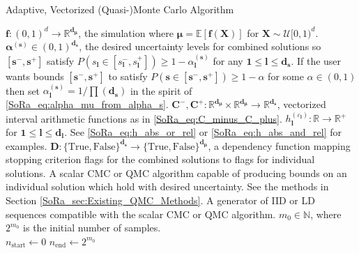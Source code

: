 \documentclass[graybox]{svmult}
\begin{document}
\begin{algorithm}[t]
    \caption{Adaptive, Vectorized (Quasi-)Monte Carlo Algorithm}
    \label{SoRa_algo:MCStoppingCriterion}
    \begin{algorithmic}
    \Require $\boldsymbol{f}: (0,1)^d \to \mathbb{R}^{\boldsymbol{d}_{\boldsymbol{\mu}}}$, the simulation where $\boldsymbol{\mu} = \mathbb{E}[\boldsymbol{f}(\boldsymbol{X})]$ for $\boldsymbol{X} \sim \mathcal{U}[0,1)^d$.
    \Require $\boldsymbol{\alpha}^{(\boldsymbol{s})} \in (0,1)^{\boldsymbol{d}_{\boldsymbol{s}}}$, the desired uncertainty levels for combined solutions so $[\boldsymbol{s}^-,\boldsymbol{s}^+]$ satisfy $P(s_{\boldsymbol{l}} \in [s_{\boldsymbol{l}}^-,s_{\boldsymbol{l}}^+]) \geq 1-\alpha^{(\boldsymbol{s})}_{\boldsymbol{l}}$ for any $\boldsymbol{1} \leq \boldsymbol{l} \leq \boldsymbol{d}_{\boldsymbol{s}}$. If the user wants bounds $[\boldsymbol{s}^-,\boldsymbol{s}^+]$ to satisfy $P(\boldsymbol{s} \in [\boldsymbol{s}^-,\boldsymbol{s}^+]) \geq 1-\alpha$ for some $\alpha \in (0,1)$ then set $\alpha_{\boldsymbol{l}}^{(\boldsymbol{s})} = 1/\prod(\boldsymbol{d}_{\boldsymbol{s}})$ in the spirit of \eqref{SoRa_eq:alpha_mu_from_alpha_s}.
    \Require $\boldsymbol{C}^-,\boldsymbol{C}^+: \mathbb{R}^{\boldsymbol{d}_{\boldsymbol{\mu}}} \times \mathbb{R}^{\boldsymbol{d}_{\boldsymbol{\mu}}} \to \mathbb{R}^{\boldsymbol{d}_{\boldsymbol{s}}}$, vectorized interval arithmetic functions as in \eqref{SoRa_eq:C_minus_C_plus}.
    \Require $h^{(\varepsilon_{\boldsymbol{l}})}_{\boldsymbol{l}}: \mathbb{R} \to \mathbb{R}^+$ for $\boldsymbol{1} \leq \boldsymbol{l} \leq \boldsymbol{d}_{\boldsymbol{l}}$. See \eqref{SoRa_eq:h_abs_or_rel} or \eqref{SoRa_eq:h_abs_and_rel} for examples.
    \Require $\boldsymbol{D}: \{\text{True},\text{False}\}^{\boldsymbol{d}_{\boldsymbol{s}}} \to \{\text{True},\text{False}\}^{\boldsymbol{d}_{\boldsymbol{\mu}}}$, a dependency function mapping stopping criterion flags for the combined solutions to flags for individual solutions. 
    \Require A scalar CMC or QMC algorithm capable of producing bounds on an individual solution which hold with desired uncertainty. See the methods in Section \ref{SoRa_sec:Existing_QMC_Methods}.
    \Require A generator of IID or LD sequences compatible with the scalar CMC or QMC algorithm. 
    \Require $m_0 \in \mathbb{N}$, where $2^{m_0}$ is the initial number of samples.
    \\ \hrulefill
    \State $n_\text{start} \gets 0$ 
    \State $n_\text{end} \gets 2^{m_0}$ 

\end{algorithmic}
\end{algorithm}
\end{document}
